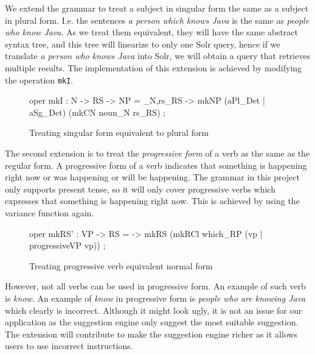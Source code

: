 We extend the grammar to treat a subject in singular form the same as a subject in plural form. I.e. the sentences \emph{a person which knows Java} is the same as \emph{people who know Java}. As we treat them equivalent, they will have the same abstract syntax tree, and this tree will linearize to only one Solr query, hence if we translate \emph{a person who knows Java} into Solr, we will obtain a query that retrieves multiple results. The implementation of this extension is achieved by modifying the operation \texttt{mkI}.

\begin{figure}[H]
\begin{code}
oper
  mkI : N -> RS -> NP = \noun_N,rs_RS -> mkNP (aPl_Det | aSg_Det)
                             (mkCN noun_N rs_RS) ;
\end{code}
\caption{Treating singular form equivalent to plural form\label{fig:linearize-using-list}}
\end{figure}

The second extension is to treat the \emph{progressive form} of a verb as the same as the regular form. A progressive form of a verb indicates that something is happening right now or was happening or will be happening. The grammar in this project only supports present tense, so it will only cover progressive verbs which expresses that something is happening right now. This is achieved by using the variance function again.

\begin{figure}[H]
\begin{code}
oper
  mkRS' : VP -> RS = \vp -> mkRS (mkRCl which_RP (vp | progressiveVP vp)) ;
\end{code}
\caption{Treating progressive verb equivalent normal form\label{fig:linearize-using-list}}
\end{figure}

However, not all verbs can be used in progressive form. An example of such verb is \emph{know}. An example of  \emph{know} in progressive form is \emph{people who are knowing Java} which clearly is incorrect. Although it might look ugly, it is not an issue for our application as the suggestion engine only suggest the most suitable suggestion. The extension will contribute to make the suggestion engine richer as it allows users to use incorrect instructions.

